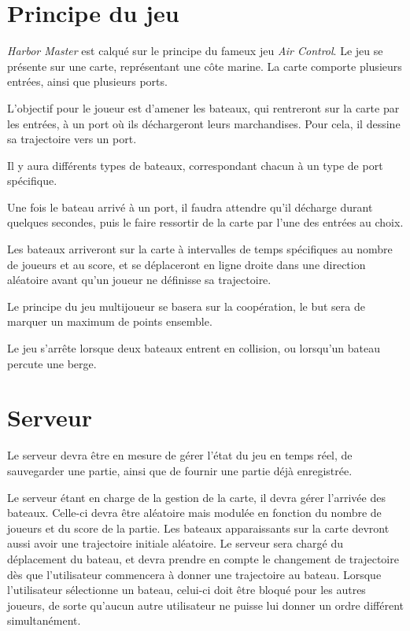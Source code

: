 
\section{Principe du jeu}
\label{sec:principeDuJeu}
\emph{Harbor Master} est calqué sur le principe du fameux jeu \emph{Air Control}.
Le jeu se présente sur une carte, représentant une côte marine. La carte comporte plusieurs entrées, ainsi que plusieurs ports.

L'objectif pour le joueur est d'amener les bateaux, qui rentreront sur la carte par les entrées, à un port où ils déchargeront leurs marchandises. Pour cela, il \og{}dessine\fg{} sa trajectoire vers un port.

Il y aura différents types de bateaux, correspondant chacun à un type de port spécifique.

Une fois le bateau arrivé à un port, il faudra attendre qu'il décharge durant quelques secondes, puis le faire ressortir de la carte par l'une des entrées au choix.

Les bateaux arriveront sur la carte à intervalles de temps spécifiques au nombre de joueurs et au score, et se déplaceront en ligne droite dans une direction aléatoire avant qu'un joueur ne définisse sa trajectoire.

Le principe du jeu multijoueur se basera sur la coopération, le but sera de marquer un maximum de points ensemble.

Le jeu s'arrête lorsque deux bateaux entrent en collision, ou lorsqu'un bateau percute une berge.


\section{Serveur}
\label{sec:serveur}
Le serveur devra être en mesure de gérer l'état du jeu en temps réel, de sauvegarder une partie, ainsi que de fournir une partie déjà enregistrée.

Le serveur étant en charge de la gestion de la carte, il devra gérer l'arrivée des bateaux. Celle-ci devra être aléatoire mais modulée en fonction du nombre de joueurs et du score de la partie. Les bateaux apparaissants sur la carte devront aussi avoir une trajectoire initiale aléatoire.
Le serveur sera chargé du déplacement du bateau, et devra prendre en compte le changement de trajectoire dès que l'utilisateur commencera à donner une trajectoire au bateau. Lorsque l'utilisateur sélectionne un bateau, celui-ci doit être bloqué pour les autres joueurs, de sorte qu'aucun autre utilisateur ne puisse lui donner un ordre différent simultanément.\\

